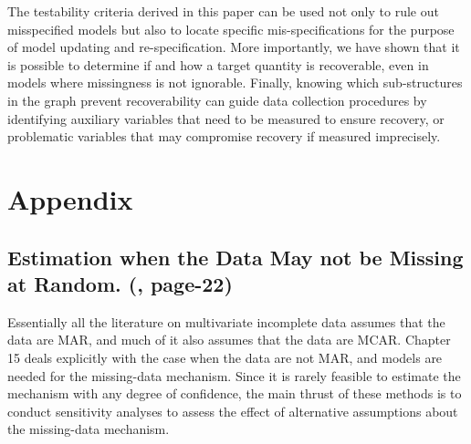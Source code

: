 \documentclass[12pt]{article}
\begin{document}
The testability criteria derived in this paper
can be used not only to rule out misspecified models
but also to locate specific mis-specifications for the purpose
of model updating and re-specification. More importantly, we
have shown that it is possible to determine if and how a
target quantity is recoverable, even in models where
missingness is not ignorable.
Finally, knowing which sub-structures in the graph prevent
recoverability can guide data collection procedures by identifying
auxiliary variables that need to be measured to ensure
recovery, or problematic variables that may compromise
recovery if measured imprecisely.



\newpage
\section{Appendix}
\subsection{Estimation when the Data May not be Missing at Random. (\cite{Rubin2014}, page-22)}
\label{app:rubin}
Essentially all the literature on multivariate incomplete data assumes that the data
are MAR, and much of it also assumes that the data are MCAR. Chapter 15 deals
explicitly with the case when the data are not MAR, and models are needed for the
missing-data mechanism. Since it is rarely feasible to estimate the mechanism with
any degree of confidence, the main thrust of these methods is to conduct sensitivity
analyses to assess the effect of alternative assumptions about the missing-data
mechanism.
\end{document}
